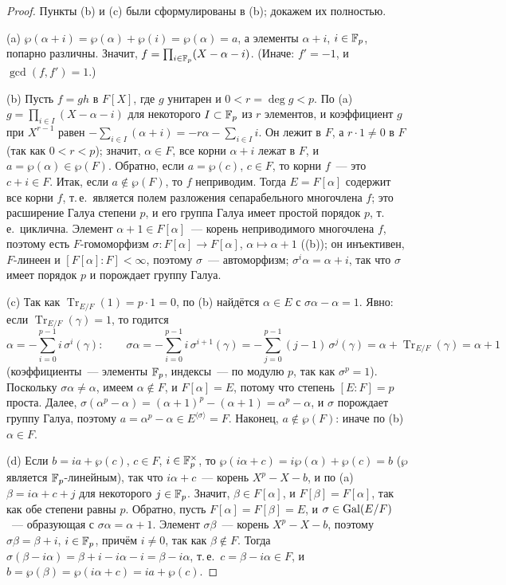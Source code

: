 \begin{proof}
Пункты (b) и (c) были сформулированы в (b); докажем их полностью.

(a) $\wp(\alpha+i)=\wp(\alpha)+\wp(i)=\wp(\alpha)=a$, а элементы $\alpha+i$, $i\in\mathbb F_p$, попарно различны. Значит,
$f=\prod_{i\in\mathbb F_p}(X-\alpha-i)$. (Иначе: $f'=-1$, и $\gcd(f,f')=1$.)

(b) Пусть $f=gh$ в $F[X]$, где $g$ унитарен и $0<r=\deg g<p$. По (a) $g=\prod_{i\in I}(X-\alpha-i)$ для некоторого
$I\subset\mathbb F_p$ из $r$ элементов, и коэффициент $g$ при $X^{r-1}$ равен $-\sum_{i\in I}(\alpha+i)=-r\alpha-\sum_{i\in I}i$.
Он лежит в $F$, а $r\cdot1\ne0$ в $F$ (так как $0<r<p$); значит, $\alpha\in F$, все корни $\alpha+i$ лежат в $F$, и
$a=\wp(\alpha)\in\wp(F)$. Обратно, если $a=\wp(c)$, $c\in F$, то корни $f$~--- это $c+i\in F$. Итак, если $a\notin\wp(F)$,
то $f$ неприводим. Тогда $E=F[\alpha]$ содержит все корни $f$, т.\,е.\ является полем разложения сепарабельного многочлена
$f$; это расширение Галуа степени $p$, и его группа Галуа имеет простой порядок $p$, т.\,е.\ циклична. Элемент $\alpha+1\in
F[\alpha]$~--- корень неприводимого многочлена $f$, поэтому есть $F$-гомоморфизм $\sigma\colon F[\alpha]\to F[\alpha]$,
$\alpha\mapsto\alpha+1$ ((b)); он инъективен, $F$-линеен и $[F[\alpha]:F]<\infty$, поэтому $\sigma$~--- автоморфизм;
$\sigma^i\alpha=\alpha+i$, так что $\sigma$ имеет порядок $p$ и порождает группу Галуа.

(c) Так как $\operatorname{Tr}_{E/F}(1)=p\cdot1=0$, по (b) найдётся $\alpha\in E$ с $\sigma\alpha-\alpha=1$. Явно: если
$\operatorname{Tr}_{E/F}(\gamma)=1$, то годится
\[
\alpha=-\sum_{i=0}^{p-1}i\,\sigma^i(\gamma):\qquad
\sigma\alpha=-\sum_{i=0}^{p-1}i\,\sigma^{i+1}(\gamma)=-\sum_{j=0}^{p-1}(j-1)\,\sigma^j(\gamma)=\alpha+\operatorname{Tr}_{E/F}(\gamma)=\alpha+1
\]
(коэффициенты~--- элементы $\mathbb F_p$, индексы~--- по модулю $p$, так как $\sigma^p=1$). Поскольку $\sigma\alpha\ne\alpha$, имеем
$\alpha\notin F$, и $F[\alpha]=E$, потому что степень $[E:F]=p$ проста. Далее,
$\sigma(\alpha^p-\alpha)=(\alpha+1)^p-(\alpha+1)=\alpha^p-\alpha$, и $\sigma$ порождает группу Галуа, поэтому
$a=\alpha^p-\alpha\in E^{\langle\sigma\rangle}=F$. Наконец, $a\notin\wp(F)$: иначе по (b) $\alpha\in F$.

(d) Если $b=ia+\wp(c)$, $c\in F$, $i\in\mathbb F_p^\times$, то $\wp(i\alpha+c)=i\wp(\alpha)+\wp(c)=b$ ($\wp$ является
$\mathbb F_p$-линейным), так что $i\alpha+c$~--- корень $X^p-X-b$, и по (a) $\beta=i\alpha+c+j$ для некоторого $j\in\mathbb F_p$. Значит,
$\beta\in F[\alpha]$, и $F[\beta]=F[\alpha]$, так как обе степени равны $p$. Обратно, пусть $F[\alpha]=F[\beta]=E$, и
$\sigma\in\operatorname{Gal}(E/F)$~--- образующая с $\sigma\alpha=\alpha+1$. Элемент $\sigma\beta$~--- корень $X^p-X-b$, поэтому
$\sigma\beta=\beta+i$, $i\in\mathbb F_p$, причём $i\ne0$, так как $\beta\notin F$. Тогда
$\sigma(\beta-i\alpha)=\beta+i-i\alpha-i=\beta-i\alpha$, т.\,е.\ $c=\beta-i\alpha\in F$, и
$b=\wp(\beta)=\wp(i\alpha+c)=ia+\wp(c)$.
\end{proof}

